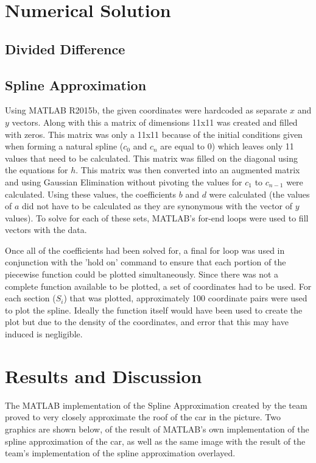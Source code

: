 \documentclass[12pt, letterpaper]{article} %
\begin{document}
\section{Numerical Solution}
\subsection{Divided Difference}
\subsection{Spline Approximation}
Using MATLAB R2015b, the given coordinates were hardcoded as separate $x$ and $y$ vectors. Along with this a matrix of dimensions 11x11 was created and filled with zeros. This matrix was only a 11x11 because of the initial conditions given when forming a natural spline ($c_0$ and $c_n$ are equal to 0) which leaves only 11 values that need to be calculated. This matrix was filled on the diagonal using the equations for $h$. This matrix was then converted into an augmented matrix and using Gaussian Elimination without pivoting the values for $c_1$ to $c_{n-1}$ were calculated. Using these values, the coefficients $b$ and $d$ were calculated (the values of $a$ did not have to be calculated as they are synonymous with the vector of $y$ values). To solve for each of these sets, MATLAB's for-end loops were used to fill vectors with the data. 

Once all of the coefficients had been solved for, a final for loop was used in conjunction with the 'hold on' command to ensure that each portion of the piecewise function could be plotted simultaneously. Since there was not a complete function available to be plotted, a set of coordinates had to be used. For each section ($S_i$) that was plotted, approximately 100 coordinate pairs were used to plot the spline. Ideally the function itself would have been used to create the plot but due to the density of the coordinates, and error that this may have induced is negligible. 

\section{Results and Discussion}
The MATLAB implementation of the Spline Approximation created by the team proved to very closely approximate the roof of the car in the picture. Two graphics are shown below, of the result of MATLAB's own implementation of the spline approximation of the car, as well as the same image with the result of the team's implementation of the spline approximation overlayed.
\end{document}
